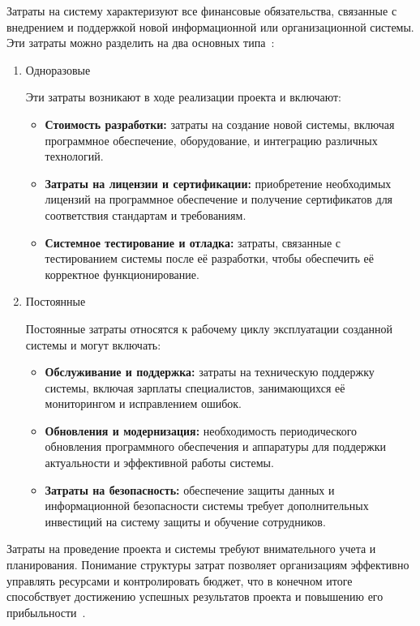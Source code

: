 Затраты на систему характеризуют все финансовые обязательства, связанные с внедрением и поддержкой новой информационной или организационной системы. Эти затраты можно разделить на два основных типа~\cite{project3}:
\begin{enumerate}
	\item Одноразовые
	
	Эти затраты возникают в ходе реализации проекта и включают:
	\begin{itemize}
		\item \textbf{Стоимость разработки:} затраты на создание новой системы, включая программное обеспечение, оборудование, и интеграцию различных технологий.
		\item \textbf{Затраты на лицензии и сертификации:} приобретение необходимых лицензий на программное обеспечение и получение сертификатов для соответствия стандартам и требованиям.
		\item \textbf{Системное тестирование и отладка:} затраты, связанные с тестированием системы после её разработки, чтобы обеспечить её корректное функционирование.
	\end{itemize}
	\item Постоянные
	
	Постоянные затраты относятся к рабочему циклу эксплуатации созданной системы и могут включать:
	\begin{itemize}
		\item \textbf{Обслуживание и поддержка:} затраты на техническую поддержку системы, включая зарплаты специалистов, занимающихся её мониторингом и исправлением ошибок.
		\item \textbf{Обновления и модернизация:} необходимость периодического обновления программного обеспечения и аппаратуры для поддержки актуальности и эффективной работы системы.
		\item \textbf{Затраты на безопасность:} обеспечение защиты данных и информационной безопасности системы требует дополнительных инвестиций на систему защиты и обучение сотрудников.
	\end{itemize}
\end{enumerate}

Затраты на проведение проекта и системы требуют внимательного учета и планирования. 
Понимание структуры затрат позволяет организациям эффективно управлять ресурсами и контролировать бюджет, что в конечном итоге способствует достижению успешных результатов проекта и повышению его прибыльности~\cite{project3}. 

